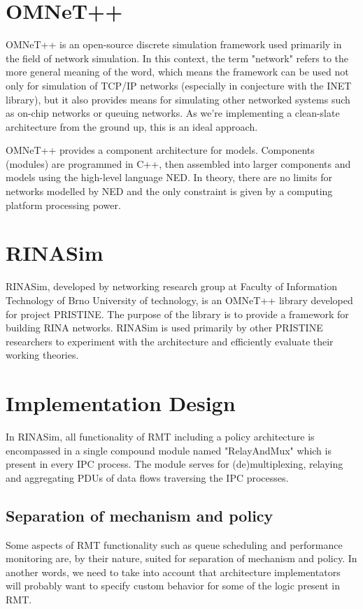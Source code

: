     \section{OMNeT++}
        OMNeT++ is an open-source discrete simulation framework used primarily in the field of network simulation. In this context, the term "network" refers to the more general meaning of the word, which means the framework can be used not only for simulation of TCP/IP networks (especially in conjecture with the INET library), but it also provides means for simulating other networked systems such as on-chip networks or queuing networks. As we're implementing a clean-slate architecture from the ground up, this is an ideal approach.

        OMNeT++ provides a component architecture for models. Components (modules) are programmed in C++, then assembled into larger components and models using the high-level language NED. In theory, there are no limits for networks modelled by NED and the only constraint is given by a computing platform processing power.

    \section{RINASim}
        RINASim, developed by networking research group at Faculty of Information Technology of Brno University of technology, is an OMNeT++ library developed for project PRISTINE. The purpose of the library is to provide a framework for building RINA networks. RINASim is used primarily by other PRISTINE researchers to experiment with the architecture and efficiently evaluate their working theories.

    \section{Implementation Design}

        In RINASim, all functionality of RMT including a policy architecture is encompassed in a single compound module named "RelayAndMux" which is present in every IPC process. The module serves for (de)multiplexing, relaying and aggregating PDUs of data flows traversing the IPC processes.

        \subsection{Separation of mechanism and policy}
            Some aspects of RMT functionality such as queue scheduling and performance monitoring are, by their nature, suited for separation of mechanism and policy. In another words, we need to take into account that architecture implementators will probably want to specify custom behavior for some of the logic present in RMT.

